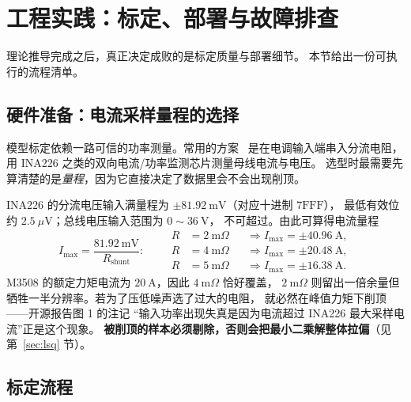 \documentclass[cn,blue,11pt,device=normal]{elegantnote}
\begin{document}
\section{工程实践：标定、部署与故障排查}

理论推导完成之后，真正决定成败的是标定质量与部署细节。
本节给出一份可执行的流程清单。

\subsection{硬件准备：电流采样量程的选择}

模型标定依赖一路可信的功率测量。常用的方案~\cite{ina226} 是在电调输入端串入分流电阻，
用 INA226 之类的双向电流/功率监测芯片测量母线电流与电压。
选型时最需要先算清楚的是\emph{量程}，因为它直接决定了数据里会不会出现削顶。

INA226 的分流电压输入满量程为 $\pm81.92\ \mathrm{mV}$（对应十进制 $7\mathrm{FFF}$），
最低有效位约 $2.5\ \mu\mathrm{V}$；总线电压输入范围为 $0\sim36\ \mathrm{V}$，
不可超过。由此可算得电流量程
\begin{equation}\label{eq:inacur}
  I_{\max} = \frac{81.92\ \mathrm{mV}}{R_{\mathrm{shunt}}} :
  \qquad
  \begin{aligned}
    R &= 2\ \mathrm{m}\Omega &&\Rightarrow I_{\max} = \pm40.96\ \mathrm{A},\\
    R &= 4\ \mathrm{m}\Omega &&\Rightarrow I_{\max} = \pm20.48\ \mathrm{A},\\
    R &= 5\ \mathrm{m}\Omega &&\Rightarrow I_{\max} = \pm16.38\ \mathrm{A}.
  \end{aligned}
\end{equation}
M3508 的额定力矩电流为 $20\ \mathrm{A}$，因此 $4\ \mathrm{m}\Omega$ 恰好覆盖，
$2\ \mathrm{m}\Omega$ 则留出一倍余量但牺牲一半分辨率。若为了压低噪声选了过大的电阻，
就必然在峰值力矩下削顶——开源报告图 1 的注记
“输入功率出现失真是因为电流超过 INA226 最大采样电流”正是这个现象。
\textbf{被削顶的样本必须剔除，否则会把最小二乘解整体拉偏}（见第~\ref{sec:lsq} 节）。

\subsection{标定流程}
\end{document}
